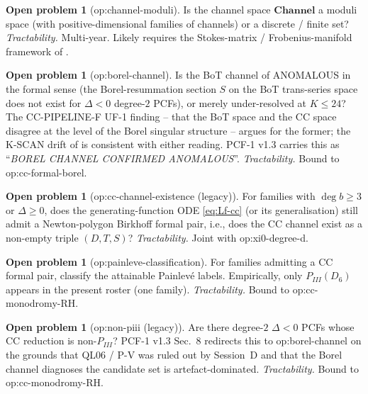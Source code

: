 \documentclass[11pt,reqno]{amsart}
\theoremstyle{plain}
\theoremstyle{definition}
\newtheorem{problem}[theorem]{Open problem}
\theoremstyle{remark}
\newcommand{\Channel}{\mathbf{Channel}}
\newcommand{\CC}{\mathrm{CC}}
\begin{document}
\begin{problem}[\textsf{op:channel-moduli}]
Is the channel space $\Channel$ a moduli space (with
positive-dimensional families of channels) or a discrete /
finite set?
\emph{Tractability.} Multi-year. Likely requires the
Stokes-matrix / Frobenius-manifold framework of
\cite{boalch2001stokes}.
\end{problem}

\begin{problem}[\textsf{op:borel-channel}]
Is the BoT channel of  ANOMALOUS in the formal
sense (the Borel-resummation section $S$ on the BoT
trans-series space does not exist for $\Delta<0$ degree-$2$
PCFs), or merely under-resolved at $K \le 24$?
The CC-PIPELINE-F UF-1 finding
\cite{siarc_cc_pipeline_f} -- that the BoT space and the
$\CC$ space disagree at the level of the Borel singular
structure -- argues for the former; the K-SCAN drift of
\cite{siarc_borel_kscan} is consistent with either reading.
PCF-1 v1.3 \cite{siarc_pcf1_v13} carries this as
``\emph{BOREL CHANNEL CONFIRMED ANOMALOUS}''.
\emph{Tractability.} Bound to \textsf{op:cc-formal-borel}.
\end{problem}

\begin{problem}[\textsf{op:cc-channel-existence} (legacy)]
For families with $\deg b \ge 3$ or $\Delta \ge 0$, does the
generating-function ODE \eqref{eq:Lf-cc} (or its
generalisation) still admit a Newton-polygon Birkhoff
formal pair, i.e., does the $\CC$ channel exist as a non-empty
triple $(D, T, S)$?
\emph{Tractability.} Joint with \textsf{op:xi0-degree-d}.
\end{problem}

\begin{problem}[\textsf{op:painleve-classification}]
For families admitting a $\CC$ formal pair, classify the
attainable Painlev\'e labels. Empirically, only $P_{III}(D_6)$
appears in the present roster (one family).
\emph{Tractability.} Bound to \textsf{op:cc-monodromy-RH}.
\end{problem}

\begin{problem}[\textsf{op:non-piii} (legacy)]
Are there degree-$2$ $\Delta < 0$ PCFs whose $\CC$ reduction
is non-$P_{III}$? PCF-1 v1.3 Sec.~8 redirects this
to \textsf{op:borel-channel} on the grounds that QL06 / P-V
was ruled out by Session~D and that
the Borel channel diagnoses the candidate set is
artefact-dominated.
\emph{Tractability.} Bound to \textsf{op:cc-monodromy-RH}.
\end{problem}
\end{document}
